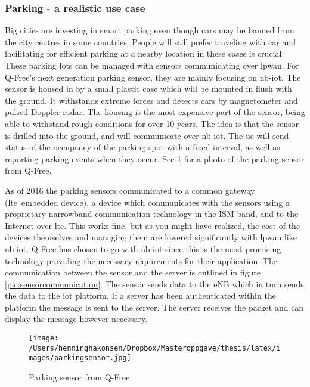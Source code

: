 \documentclass[USenglish]{ifimaster}  %
\begin{document}
\subsubsection{Parking - a realistic use case} \label{ssection:sensoroutline}
Big cities are investing in smart parking even though cars may be banned from the city centres in some countries. People will still prefer traveling with car and facilitating for efficient parking at a nearby location in these cases is crucial. These parking lots can be managed with sensors communicating over \acrshort{lpwan}. For Q-Free's next generation parking sensor, they are mainly focusing on \acrshort{nb-iot}. The sensor is housed in by a small plastic case which will be mounted in flush with the ground. It withstands extreme forces and detects cars by magnetometer and pulsed Doppler radar. The housing is the most expensive part of the sensor, being able to withstand rough conditions for over 10 years. The idea is that the sensor is drilled into the ground, and will communicate over \acrshort{nb-iot}. The \acrshort{ue} will send status of the occupancy of the parking spot with a fixed interval, as well as reporting parking events when they occur. See \ref{pic:parkingsensor} for a photo of the parking sensor from Q-Free.

As of 2016 the parking sensors communicated to a common gateway (\acrshort{lte} embedded device), a device which communicates with the sensors using a proprietary narrowband communication technology in the ISM band, and to the Internet over \acrshort{lte}. This works fine, but as you might have realized, the cost of the devices themselves and managing them are lowered significantly with \acrshort{lpwan} like \acrshort{nb-iot}. Q-Free has chosen to go with \acrshort{nb-iot} since this is the most promising technology providing the necessary requirements for their application. The communication between the sensor and the server is outlined in figure \vref{pic:sensorcommunication}. The sensor sends data to the eNB which in turn sends the data to the \acrshort{iot} platform. If a server has been authenticated within the platform the message is sent to the server. The server receives the packet and can display the message however necessary.

\begin{figure}[H]
  \centering\texttt{[image: /Users/henninghakonsen/Dropbox/Masteroppgave/thesis/latex/images/parkingsensor.jpg]}
  \caption[Parking sensor]{Parking sensor from Q-Free\cite{person:ola}}
  \label{pic:parkingsensor}
\end{figure}
\end{document}
